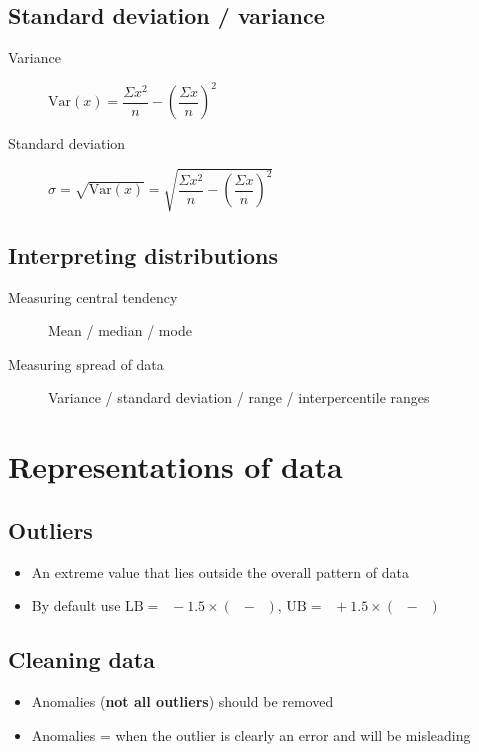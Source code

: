 \documentclass[fleqn, 11pt]{article}
\DeclareMathOperator\UQ{Q_3}
\DeclareMathOperator\LQ{Q_1}
\begin{document}
	\subsection{Standard deviation / variance}
	\begin{description}
		\item[Variance] $\mathrm{Var}(x)=\dfrac{\Sigma x^2}{n} - (\dfrac{\Sigma x}{n})^2$
		\item[Standard deviation] $\sigma=\sqrt{\mathrm{Var}(x)}=\sqrt{\dfrac{\Sigma x^2}{n} - (\dfrac{\Sigma x}{n})^2}$
	\end{description}
	
	\subsection{Interpreting distributions}
	\begin{description}
		\item[Measuring central tendency] Mean / median / mode
		\item[Measuring spread of data] Variance / standard deviation / range / interpercentile ranges
	\end{description}
	
	
	\pagebreak
	
	
	\section{Representations of data}
	\subsection{Outliers}
	\begin{itemize}
		\item An extreme value that lies outside the overall pattern of data
		\item By default use $\text{LB} = \LQ - 1.5\times(\UQ-\LQ)$, $\text{UB} = \UQ + 1.5\times(\UQ-\LQ)$
	\end{itemize}
	
	\subsection{Cleaning data}
	\begin{itemize}
		\item Anomalies (\textbf{not all outliers}) should be removed
		\item Anomalies = when the outlier is clearly an error and will be misleading
	\end{itemize}
	
\end{document}
